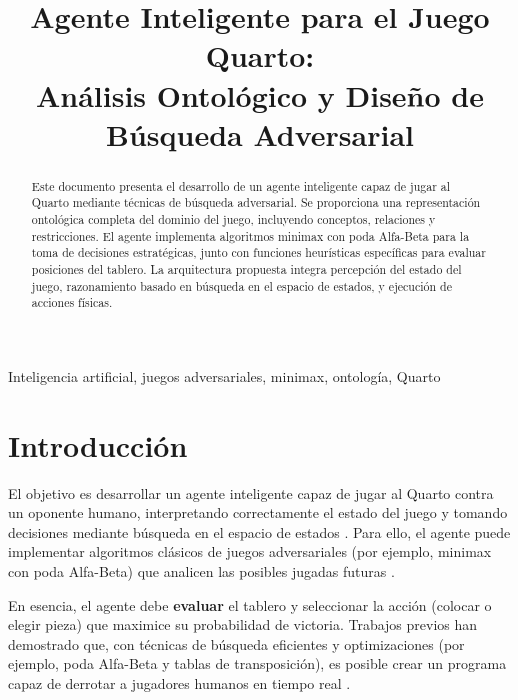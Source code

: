 \documentclass[conference]{IEEEtran}
\begin{document}
\title{Agente Inteligente para el Juego Quarto:\\
Análisis Ontológico y Diseño de Búsqueda Adversarial}

\author{
}

\maketitle

\begin{abstract}
Este documento presenta el desarrollo de un agente inteligente capaz de jugar al Quarto mediante técnicas de búsqueda adversarial. Se proporciona una representación ontológica completa del dominio del juego, incluyendo conceptos, relaciones y restricciones. El agente implementa algoritmos minimax con poda Alfa-Beta para la toma de decisiones estratégicas, junto con funciones heurísticas específicas para evaluar posiciones del tablero. La arquitectura propuesta integra percepción del estado del juego, razonamiento basado en búsqueda en el espacio de estados, y ejecución de acciones físicas.
\end{abstract}

\begin{IEEEkeywords}
Inteligencia artificial, juegos adversariales, minimax, ontología, Quarto
\end{IEEEkeywords}

\section{Introducción}

El objetivo es desarrollar un agente inteligente capaz de jugar al Quarto contra un oponente humano, interpretando correctamente el estado del juego y tomando decisiones mediante búsqueda en el espacio de estados \cite{muller2009}. Para ello, el agente puede implementar algoritmos clásicos de juegos adversariales (por ejemplo, minimax con poda Alfa-Beta) que analicen las posibles jugadas futuras \cite{santana2012}.

En esencia, el agente debe \textbf{evaluar} el tablero y seleccionar la acción (colocar o elegir pieza) que maximice su probabilidad de victoria. Trabajos previos han demostrado que, con técnicas de búsqueda eficientes y optimizaciones (por ejemplo, poda Alfa-Beta y tablas de transposición), es posible crear un programa capaz de derrotar a jugadores humanos en tiempo real \cite{russell2016}.
\end{document}

